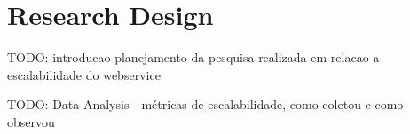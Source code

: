 \section{Research Design} 
\label{sec:research}

TODO: introducao-planejamento da pesquisa realizada em relacao a escalabilidade
do webservice

TODO: Data Analysis - métricas de escalabilidade, como coletou e como observou

